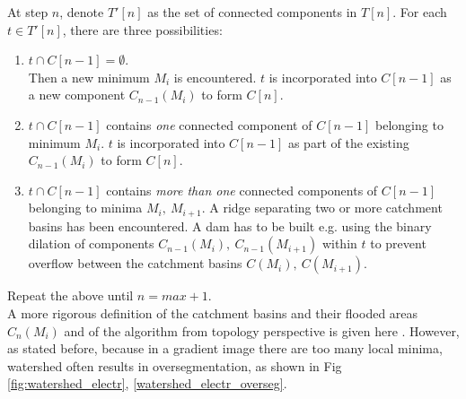 \documentclass[a4paper]{article}
\begin{document}
At step $n$, denote $T'[n]$ as the set of connected components in $T[n]$. For each $t\in T'[n]$, there are three possibilities:
\begin{enumerate}
    \item $t \cap C[n-1] = \emptyset$.\\
    Then a new minimum $M_i$ is encountered. $t$ is incorporated into $C[n-1]$ as a new component $C_{n-1}(M_i)$ to form $C[n]$.
    \item $t \cap C[n-1]$ contains \textit{one} connected component of $C[n-1]$ belonging to minimum $M_i$. $t$ is incorporated into $C[n-1]$ as part of the existing $C_{n-1}(M_i)$ to form $C[n]$.
    \item $t \cap C[n-1]$ contains \textit{more than one}
    connected components of $C[n-1]$ belonging to minima $M_i,\ M_{i+1}$. A ridge separating two or more catchment basins has been encountered. A dam has to be built e.g. using the binary dilation of components $C_{n-1}(M_i), \ C_{n-1}(M_{i+1})$ within $t$ to prevent overflow between the catchment basins $C(M_i), \ C(M_{i+1})$.
\end{enumerate}
Repeat the above until $n=max+1$.\\
A more rigorous definition of the catchment basins and their flooded areas $C_n(M_i)$ and of the algorithm from topology perspective is given here \TODO[ref]. However, as stated before, because in a gradient image there are too many local minima, watershed often results in oversegmentation, as shown in Fig \ref{fig:watershed_electr}, \ref{watershed_electr_overseg}.
\end{document}
